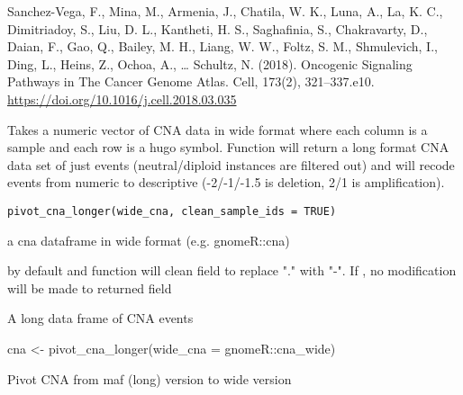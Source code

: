 \documentclass[a4paper]{book}
\begin{document}
%
\begin{Source}\relax
Sanchez-Vega, F., Mina, M., Armenia, J., Chatila, W. K., Luna, A., La, K. C., Dimitriadoy, S., Liu, D. L., Kantheti, H. S., Saghafinia, S., Chakravarty, D., Daian, F., Gao, Q., Bailey, M. H., Liang, W. W., Foltz, S. M., Shmulevich, I., Ding, L., Heins, Z., Ochoa, A., … Schultz, N. (2018). Oncogenic Signaling Pathways in The Cancer Genome Atlas. Cell, 173(2), 321–337.e10. \url{https://doi.org/10.1016/j.cell.2018.03.035}
\end{Source}
%
\begin{Description}\relax
Takes a numeric vector of CNA data in wide format where each column is a sample
and each row is a hugo symbol. Function will return a long format CNA data set
of just events (neutral/diploid instances are filtered out) and will recode events from
numeric to descriptive (-2/-1/-1.5 is deletion, 2/1 is amplification).
\end{Description}
%
\begin{Usage}
\begin{verbatim}
pivot_cna_longer(wide_cna, clean_sample_ids = TRUE)
\end{verbatim}
\end{Usage}
%
\begin{Arguments}
\begin{ldescription}
\item[\code{wide\_cna}] a cna dataframe in wide format (e.g. gnomeR::cna)

\item[\code{clean\_sample\_ids}]  by default and function will clean
 field to replace "." with "-". If ,
no modification will be made to returned  field
\end{ldescription}
\end{Arguments}
%
\begin{Value}
A long data frame of CNA events
\end{Value}
%
\begin{Examples}
\begin{ExampleCode}
cna <- pivot_cna_longer(wide_cna = gnomeR::cna_wide)
\end{ExampleCode}
\end{Examples}
%
\begin{Description}\relax
Pivot CNA from maf (long) version to wide version
\end{Description}
\end{document}
